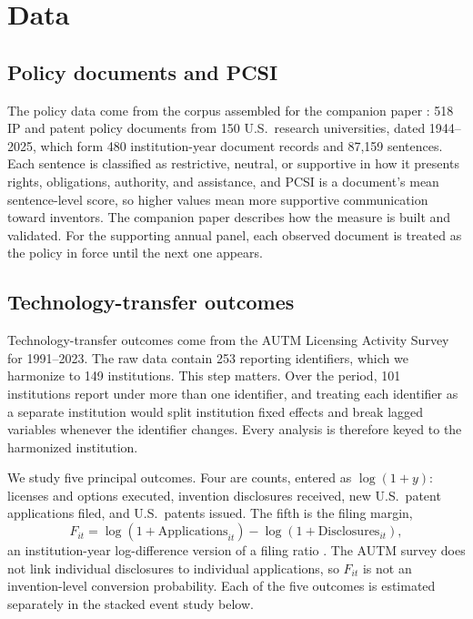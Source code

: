 \section{Data}\label{sec:data}

\subsection{Policy documents and PCSI}

The policy data come from the corpus assembled for the companion paper \citep{SharmaPCSI2026}: 518 IP and patent policy documents from 150 U.S.\ research universities, dated 1944--2025, which form 480 institution-year document records and 87,159 sentences. Each sentence is classified as restrictive, neutral, or supportive in how it presents rights, obligations, authority, and assistance, and PCSI is a document's mean sentence-level score, so higher values mean more supportive communication toward inventors. The companion paper describes how the measure is built and validated. For the supporting annual panel, each observed document is treated as the policy in force until the next one appears.

\subsection{Technology-transfer outcomes}

Technology-transfer outcomes come from the AUTM Licensing Activity Survey for 1991--2023. The raw data contain 253 reporting identifiers, which we harmonize to 149 institutions. This step matters. Over the period, 101 institutions report under more than one identifier, and treating each identifier as a separate institution would split institution fixed effects and break lagged variables whenever the identifier changes. Every analysis is therefore keyed to the harmonized institution.

We study five principal outcomes. Four are counts, entered as $\log(1+y)$: licenses and options executed, invention disclosures received, new U.S.\ patent applications filed, and U.S.\ patents issued. The fifth is the filing margin,
\begin{equation}
F_{it}=\log(1+\text{Applications}_{it})-\log(1+\text{Disclosures}_{it}),
\label{eq:filingmargin}
\end{equation}
an institution-year log-difference version of a filing ratio \citep{ChoudhryPonzio2020}. The AUTM survey does not link individual disclosures to individual applications, so $F_{it}$ is not an invention-level conversion probability. Each of the five outcomes is estimated separately in the stacked event study below.


